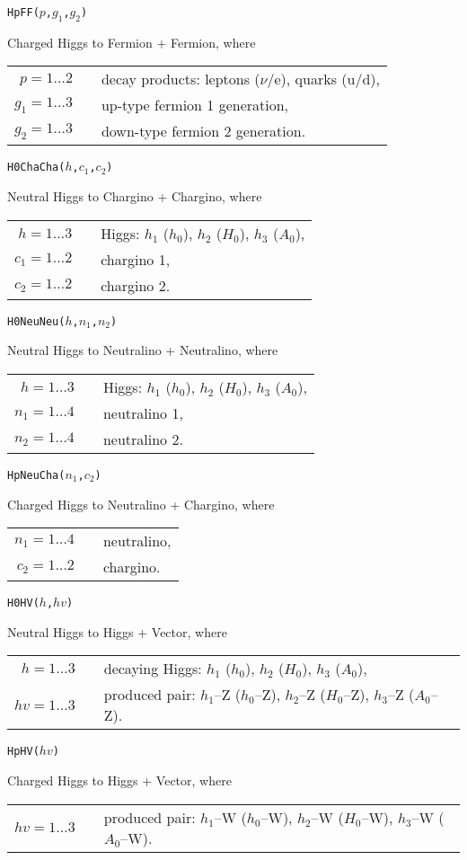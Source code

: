 \documentclass[12pt,a4paper]{report}
\newcommand{\CODE}[1]{\texttt{#1}}
\newcommand{\MACRO}[1]{\item
  \CODE{#1}\par}
\begin{document}
\MACRO{HpFF($p$,$g_1$,$g_2$)}
Charged Higgs to Fermion + Fermion, where \\[.5ex]
\begin{tabular}{rcl}
  $p = 1\dots 2$ && decay products: leptons ($\nu$/e), quarks (u/d), \\
  $g_1 = 1\dots 3$ && up-type fermion 1 generation, \\
  $g_2 = 1\dots 3$ && down-type fermion 2 generation.
\end{tabular}

\MACRO{H0ChaCha($h$,$c_1$,$c_2$)}
Neutral Higgs to Chargino + Chargino, where \\[.5ex]
\begin{tabular}{rcl}
  $h = 1\dots 3$ && Higgs:
                    $h_1$ ($h_0$), $h_2$ ($H_0$), $h_3$ ($A_0$), \\
  $c_1 = 1\dots 2$ && chargino 1, \\
  $c_2 = 1\dots 2$ && chargino 2.
\end{tabular}

\MACRO{H0NeuNeu($h$,$n_1$,$n_2$)}
Neutral Higgs to Neutralino + Neutralino, where \\[.5ex]
\begin{tabular}{rcl}
  $h = 1\dots 3$ && Higgs:
                    $h_1$ ($h_0$), $h_2$ ($H_0$), $h_3$ ($A_0$), \\
  $n_1 = 1\dots 4$ && neutralino 1, \\
  $n_2 = 1\dots 4$ && neutralino 2.
\end{tabular}

\MACRO{HpNeuCha($n_1$,$c_2$)}
Charged Higgs to Neutralino + Chargino, where \\[.5ex]
\begin{tabular}{rcl}
  $n_1 = 1\dots 4$ && neutralino, \\
  $c_2 = 1\dots 2$ && chargino.
\end{tabular}

\MACRO{H0HV($h$,$\mathit{hv}$)}
Neutral Higgs to Higgs + Vector, where \\[.5ex]
\begin{tabular}{rcl}
  $h = 1\dots 3$ && decaying Higgs:
                    $h_1$ ($h_0$), $h_2$ ($H_0$), $h_3$ ($A_0$), \\
  $\mathit{hv} = 1\dots 3$ && produced pair:
                    $h_1$--Z ($h_0$--Z),
                    $h_2$--Z ($H_0$--Z),
                    $h_3$--Z ($A_0$--Z).
\end{tabular}

\MACRO{HpHV($\mathit{hv}$)}
Charged Higgs to Higgs + Vector, where \\[.5ex]
\begin{tabular}{rcl}
  $\mathit{hv} = 1\dots 3$ && produced pair:
                    $h_1$--W ($h_0$--W),
                    $h_2$--W ($H_0$--W),
                    $h_3$--W ($A_0$--W).
\end{tabular}
\end{document}
